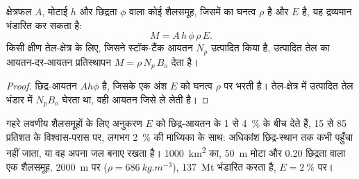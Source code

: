 \begin{omfigure}
\begin{minipage}[b]{0.49\linewidth}
\end{minipage}
\par{}
\end{omfigure}

\begin{proposition}\label{prop:b2:energy-geology:capacity}
क्षेत्रफल $A$, मोटाई $h$ और छिद्रता $\phi$ वाला कोई शैलसमूह, जिसमें  का घनत्व $\rho$
है और  $E$ है, यह द्रव्यमान भंडारित कर सकता है:
\begin{equation}
M = A\,h\,\phi\,\rho\,E .
\label{eq:b2:energy-geology:capacity}
\end{equation}
किसी क्षीण तेल-क्षेत्र के लिए, जिसने स्टॉक-टैंक आयतन $N_p$ उत्पादित किया है, उत्पादित तेल का आयतन-दर-आयतन
प्रतिस्थापन $M = \rho\,N_p\,B_o$ देता है।
\end{proposition}

\begin{proof}
छिद्र-आयतन $Ah\phi$ है, जिसके एक अंश $E$ को  घनत्व $\rho$ पर भरती है। तेल-क्षेत्र में
उत्पादित तेल भंडार में $N_pB_o$ घेरता था, वही आयतन जिसे  ले लेती है।
\end{proof}

गहरे लवणीय शैलसमूहों के लिए अनुकरण $E$ को छिद्र-आयतन के 1 से \qty{4}{\percent} के बीच देते हैं,
15 से 85 प्रतिशत के विश्वास-परास पर, लगभग \qty{2}{\percent} की माध्यिका के साथ: अधिकांश छिद्र-स्थान तक
कभी पहुँचा नहीं जाता, या वह अपना जल बनाए रखता है। \qty{1000}{km^2} का, \qty{50}{m} मोटा और
0.20 छिद्रता वाला एक शैलसमूह, \qty{2000}{m} पर ($\rho = \qty{686}{kg.m^{-3}}$), \qty{137}{Mt} भंडारित करता है, $E =
\qty{2}{\percent}$ पर।

